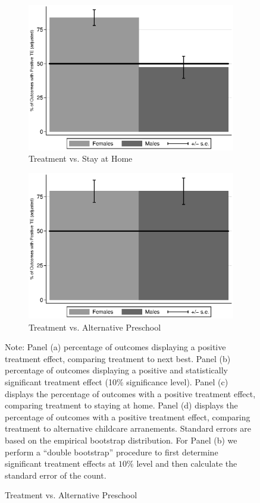 \begin{figure}
\begin{subfigure}[h]{0.4\textwidth}
		\caption{ Treatment vs. Stay at Home} \label{fig:ppositivehome}
		\includegraphics[width=\textwidth]{output/epan_ipw_p0_all.eps}
\end{subfigure}%
\begin{subfigure}[h]{0.4\textwidth}
	\centering
	\caption{Treatment vs. Alternative Preschool} \label{fig:ppositivealternative}
		\includegraphics[width=\textwidth]{output/epan_ipw_p1_all.eps}
\end{subfigure}
\footnotesize \justify
Note: Panel (a) percentage of outcomes displaying a positive treatment effect, comparing treatment to next best. Panel (b) percentage of outcomes displaying a positive and statistically significant treatment effect (10\% significance level). Panel (c) displays the percentage of outcomes with a positive treatment effect, comparing treatment to staying at home. Panel (d) displays the percentage of outcomes with a positive treatment effect, comparing treatment to alternative childcare arranements. Standard errors are based on the empirical bootstrap distribution. For Panel (b) we perform a ``double bootstrap'' procedure to first determine significant treatment effects at $10\%$ level and then calculate the standard error of the count.\\
\end{figure}


